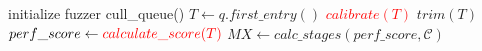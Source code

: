 \begin{algorithm}
    initialize fuzzer\;
     {
      cull\_queue()\;
      $T \leftarrow q.first\_entry()$\;
      \textcolor{red}{$calibrate(T)$}\;
      $trim(T)$\;
      $perf\_score \leftarrow \textcolor{red}{calculate\_score(T)}$\;
      $MX \leftarrow calc\_stages(perf\_score, \mathcal{C})$\;
    }

    \caption{$waffle-fuzz$}
    \label{algo:waffle-fuzz}
\end{algorithm}